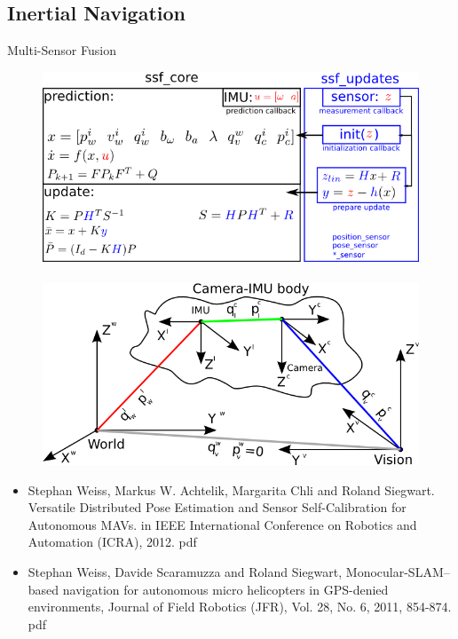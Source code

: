 \documentclass[14pt,hyperref={CJKbookmarks=true}]{beamer}
\theoremstyle{plain}
\theoremstyle{definition}
\theoremstyle{remark}
\begin{document}
\subsection{Inertial Navigation}
\begin{frame}{Multi-Sensor Fusion}
\begin{figure}
\centering
\includegraphics[width=0.5\linewidth]{msf-structure.png}
\\\quad\\
\includegraphics[width=0.5\linewidth]{framesetup.png}
\end{figure}
\begin{itemize}\tiny
\item Stephan Weiss, Markus W. Achtelik, Margarita Chli and Roland Siegwart. Versatile Distributed Pose Estimation and Sensor Self-Calibration for Autonomous MAVs. in IEEE International Conference on Robotics and Automation (ICRA), 2012. pdf
\item Stephan Weiss, Davide Scaramuzza and Roland Siegwart, Monocular-SLAM–based navigation for autonomous micro helicopters in GPS-denied environments, Journal of Field Robotics (JFR), Vol. 28, No. 6, 2011, 854-874. pdf
\end{itemize}
\end{frame}
\end{document}
